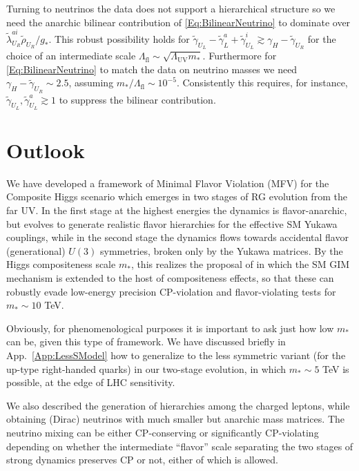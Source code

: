 \documentclass[aps,prl,twocolumn,showpacs,10pt,preprintnumbers,nofootinbib]{revtex4-2}
\newcommand{\gst}{g_*}
\newcommand{\mst}{m_*}
\newcommand{\Lfl}{\Lambda_{\text{fl}}}
\newcommand{\tg}{\tilde{\gamma}}
\begin{document}
{Turning to neutrinos the data does not support a hierarchical structure so we need the anarchic bilinear contribution of \eqref{Eq:BilinearNeutrino} to dominate over $\tilde{\lambda}_{U_R}^{ai} \tilde{\rho}_{U_R}/\gst$. This robust possibility holds for $\tilde{\gamma}_{U_L}-\tg_{L}^a+ \tg_{U_L}^i\gtrsim\gamma_H-\tilde{\gamma}_{U_R}$ for the choice of an intermediate scale $\Lfl\sim \sqrt{\Lambda_{\text{UV}} \mst}$. Furthermore for \eqref{Eq:BilinearNeutrino} to match the data on neutrino masses we need $\gamma_H-\tilde{\gamma}_{U_R}\sim 2.5$, assuming $\mst/\Lfl\sim10^{-5}$. Consistently this requires, for instance, $\tg_{U_L},\tg_{U_L}^{a}\gtrsim 1$ to suppress the bilinear contribution.

\section{Outlook}\label{Sec:Outlook}

 We have developed a framework of Minimal Flavor Violation (MFV) for the Composite Higgs scenario which emerges in two stages of RG evolution from the far UV. In the first stage at the highest energies the dynamics is flavor-anarchic, but evolves to generate realistic flavor hierarchies for the effective SM Yukawa couplings, while in the second stage the dynamics flows towards accidental flavor (generational) $U(3)$ symmetries, broken only by the Yukawa matrices. By the Higgs compositeness scale $m_*$, this realizes the proposal of \cite{Redi:2011zi, Barbieri:2012tu,Redi:2013pga,Redi:2012uj,Glioti:2024hye} in which the SM GIM mechanism is extended to the host of compositeness effects, so that these can robustly evade low-energy precision CP-violation and flavor-violating tests for $m_* \sim 10$ TeV. 

Obviously, for phenomenological purposes it is important to ask just how low $m_*$ can be, given this type of framework. We have discussed briefly in App.~\ref{App:LessSModel} how to generalize to the less symmetric variant (for the up-type right-handed quarks) in our two-stage evolution, in which $m_* \sim 5$ TeV is possible, at the edge of LHC sensitivity. 

We also described the generation of hierarchies among the charged leptons, while obtaining (Dirac) neutrinos with much smaller but anarchic mass matrices. The neutrino mixing can be either CP-conserving or significantly CP-violating depending on whether the intermediate ``flavor'' scale separating the two stages of strong dynamics preserves CP or not, either of which is allowed. 

}
\end{document}
